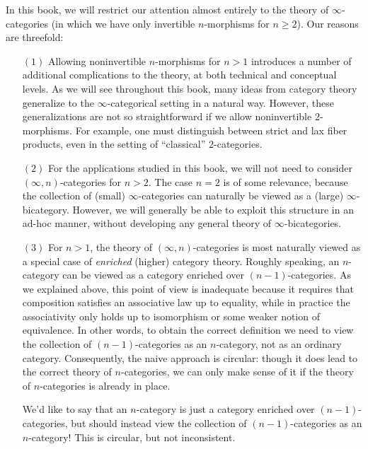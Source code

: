 In this book, we will restrict our attention almost entirely to the theory of $\infty$-categories (in which we have only invertible $n$-morphisms for $n \geq 2$). Our reasons are threefold:
\begin{itemize}
\item[$(1)$] Allowing noninvertible $n$-morphisms for $n > 1$ introduces a number of additional complications to the theory, at both technical and conceptual levels. As we will see throughout this book, many ideas from category theory generalize to the $\infty$-categorical setting in a natural way. However, these generalizations are not so straightforward if we allow noninvertible $2$-morphisms. For example, one must distinguish between strict and lax fiber products, even in the setting of ``classical'' $2$-categories.

\item[$(2)$] For the applications studied in this book, we will not need to consider $(\infty,n)$-categories for $n > 2$. The case $n=2$ is of some relevance, because the collection of (small) $\infty$-categories can naturally be viewed as a (large) $\infty$-bicategory. However, we will generally be able to exploit this structure in an ad-hoc manner, without developing any general theory of $\infty$-bicategories.

\item[$(3)$] For $n > 1$, the theory of $(\infty,n)$-categories is most naturally viewed as a special case of {\em enriched} (higher) category theory. Roughly speaking, an $n$-category can be viewed as a category enriched over $(n-1)$-categories. As we explained above, this point of view is inadequate because it requires that composition satisfies an associative law up to equality, while in practice the associativity only holds up to isomorphism or some weaker notion of equivalence.
In other words, to obtain the correct definition we need to view the collection of $(n-1)$-categories
as an $n$-category, not as an ordinary category. Consequently, the naive approach is circular:  though it does lead to the correct theory of $n$-categories, we can only make sense of it if the theory of $n$-categories is already in place.
\begin{shaded}
We'd like to say that an $n$-category is just a category enriched over $(n-1)$-categories, but should instead view the collection of $(n-1)$-categories as an $n$-category! This is circular, but not inconsistent.
\end{shaded}


\end{itemize}
